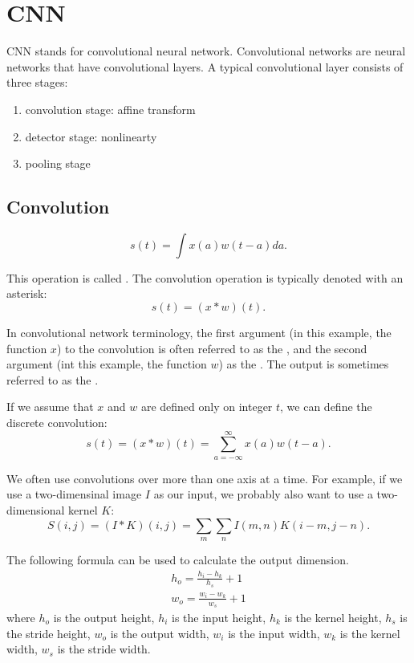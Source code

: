 
\chapter{CNN}

CNN stands for convolutional neural network.
Convolutional networks are neural networks that have convolutional layers.
A typical convolutional layer consists of three stages:
\begin{enumerate}
\item convolution stage: affine transform
\item detector stage: nonlinearty
\item pooling stage
\end{enumerate}

\section{Convolution}

\begin{equation}
  \label{eq:convolution}
  s(t) = \int x(a)w(t-a)da.
\end{equation}

This operation is called .
The convolution operation is typically denoted with an asterisk:
\begin{equation}
  s(t) = (x*w)(t).
\end{equation}

In convolutional network terminology, the first argument (in this example, the function $x$) to the convolution is often referred to as the , and the second argument (int this example, the function $w$) as the .
The output is sometimes referred to as the .

If we assume that $x$ and $w$ are defined only on integer $t$, we can define the discrete convolution:
\begin{equation}
  \label{eq:discrete-convolution}
  s(t) = (x*w)(t) = \sum_{a=-\infty}^{\infty} x(a)w(t-a).
\end{equation}

We often use convolutions over more than one axis at a time.
For example, if we use a two-dimensinal image $I$ as our input, we probably also want to use a two-dimensional kernel $K$:
\begin{equation}
  S(i,j) = (I*K)(i,j) = \sum_m\sum_n I(m,n)K(i-m,j-n).
\end{equation}


The following formula can be used to calculate the output dimension.
\begin{gather}
  h_{o} = \frac{h_{i} - h_{k}}{h_{s}} + 1\\
  w_{o} = \frac{w_{i} - w_{k}}{w_{s}} + 1
\end{gather}
where \(h_{o}\) is the output height, \(h_{i}\) is the input height, \(h_{k}\) is the kernel height, \(h_{s}\) is the stride height, \(w_{o}\) is the output width, \(w_{i}\) is the input width, \(w_{k}\) is the kernel width, \(w_{s}\) is the stride width.

